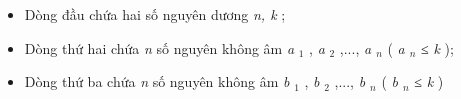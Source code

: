 \begin{itemize}
	\item Dòng đầu chứa hai số nguyên dương \emph{ n, k } ;
	\item Dòng thứ hai chứa \emph{ n } số nguyên không âm \emph{ a }$_ 1 $ , \emph{ a }$_ 2 $ ,..., \emph{ a $_ n $} ( \emph{ a $_ n $} ≤ \emph{ k } );
	\item Dòng thứ ba chứa \emph{ n } số nguyên không âm \emph{ b }$_ 1 $ , \emph{ b }$_ 2 $ ,..., \emph{ b $_ n $} ( \emph{ b $_ n $} ≤ \emph{ k } )
\end{itemize}

\